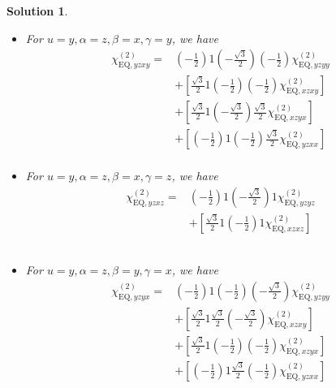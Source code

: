 \documentclass[UTF8,10pt,a4paper]{article}
\theoremstyle{Problem}
\theoremstyle{Solution}
\newtheorem*{sol}{Solution}
\begin{document}
\begin{sol}
\begin{itemize}
\begin{align}
\nonumber&+\left[\left(-\frac{1}{2}\right)1\left(-\frac{1}{2}\right)\left(-\frac{1}{2}\right)\chi_{\text{EQ},yzxx}^{(2)}\right]\\
&
\end{align}\normalsize
\item For $u=y,\alpha=z,\beta=x,\gamma=y$, we have
\footnotesize\begin{align}
\nonumber\chi_{\text{EQ},yzxy}^{(2)}=&\left(-\frac{1}{2}\right)1\left(-\frac{\sqrt{3}}{2}\right)\left(-\frac{1}{2}\right)\chi_{\text{EQ},yzyy}^{(2)}\\
\nonumber&+\left[\frac{\sqrt{3}}{2}1\left(-\frac{1}{2}\right)\left(-\frac{1}{2}\right)\chi_{\text{EQ},xzxy}^{(2)}\right]\\
\nonumber&+\left[\frac{\sqrt{3}}{2}1\left(-\frac{\sqrt{3}}{2}\right)\frac{\sqrt{3}}{2}\chi_{\text{EQ},xzyx}^{(2)}\right]\\
\nonumber&+\left[\left(-\frac{1}{2}\right)1\left(-\frac{1}{2}\right)\frac{\sqrt{3}}{2}\chi_{\text{EQ},yzxx}^{(2)}\right]\\
&
\end{align}\normalsize
\item For $u=y,\alpha=z,\beta=x,\gamma=z$, we have
\footnotesize\begin{align}
\nonumber\chi_{\text{EQ},yzxz}^{(2)}=&\left(-\frac{1}{2}\right)1\left(-\frac{\sqrt{3}}{2}\right)1\chi_{\text{EQ},yzyz}^{(2)}\\
\nonumber&+\left[\frac{\sqrt{3}}{2}1\left(-\frac{1}{2}\right)1\chi_{\text{EQ},xzxz}^{(2)}\right]\\
\nonumber&\\
\nonumber&\\
&
\end{align}\normalsize
\item For $u=y,\alpha=z,\beta=y,\gamma=x$, we have
\footnotesize\begin{align}
\nonumber\chi_{\text{EQ},yzyx}^{(2)}=&\left(-\frac{1}{2}\right)1\left(-\frac{1}{2}\right)\left(-\frac{\sqrt{3}}{2}\right)\chi_{\text{EQ},yzyy}^{(2)}\\
\nonumber&+\left[\frac{\sqrt{3}}{2}1\frac{\sqrt{3}}{2}\left(-\frac{\sqrt{3}}{2}\right)\chi_{\text{EQ},xzxy}^{(2)}\right]\\
\nonumber&+\left[\frac{\sqrt{3}}{2}1\left(-\frac{1}{2}\right)\left(-\frac{1}{2}\right)\chi_{\text{EQ},xzyx}^{(2)}\right]\\
\nonumber&+\left[\left(-\frac{1}{2}\right)1\frac{\sqrt{3}}{2}\left(-\frac{1}{2}\right)\chi_{\text{EQ},yzxx}^{(2)}\right]\\

\end{align}
\end{itemize}
\end{sol}
\end{document}
